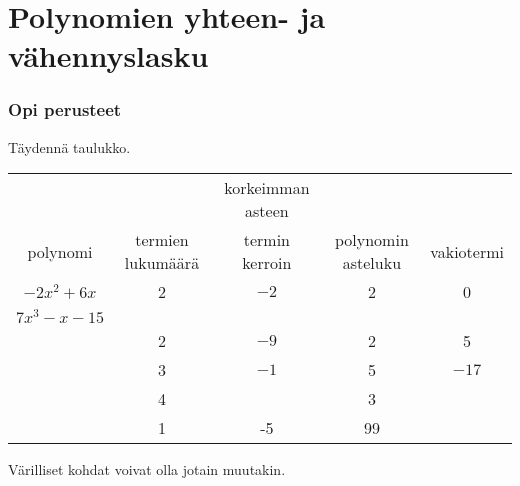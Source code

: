 \section*{Polynomien yhteen- ja vähennyslasku}



\Harjoitustehtavat

\subsubsection*{Opi perusteet}

\begin{tehtava}
    Täydennä taulukko.
        
    \begin{tabular}{|c|c|c|c|c|}
                                                                                           \hline
             &                   & korkeimman asteen &                     &            \\
polynomi     & termien lukumäärä & termin kerroin    & polynomin asteluku  & vakiotermi \\ \hline
$-2x^2+6x$   &        2          &         $-2$      &       2             &    0       \\ \hline 
$7x^3-x-15$  &                   &                   &                     &            \\ \hline 
             &        2          &          $-9$     &       2             &    5       \\ \hline 
             &        3          &          $-1$     &       5             &    $-17$   \\ \hline 
             &        4          &                   &       3             &            \\ \hline 
             &        1          &          -5       &       99            &            \\ \hline                           
    \end{tabular}
    \begin{vastaus}
    Värilliset kohdat voivat olla jotain muutakin.
    

\end{vastaus}
\end{tehtava}
